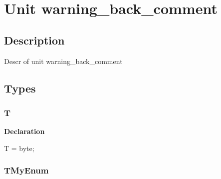 \documentclass{report}
\newif\ifpdf
\begin{document}
\label{toc}\tableofcontents
\newpage
\newlength{\tmplength}
\chapter{Unit warning{\_}back{\_}comment}
\label{warning_back_comment}
\section{Description}
Descr of unit warning{\_}back{\_}comment
\section{Types}
\ifpdf
\subsection*{\large{\textbf{T}}\normalsize\hspace{1ex}\hrulefill}
\else
\subsection*{T}
\fi
\label{warning_back_comment-T}
\begin{list}{}{
\setlength{\itemindent}{0cm}
\setlength{\listparindent}{0cm}
\setlength{\leftmargin}{\evensidemargin}
\addtolength{\leftmargin}{\tmplength}
\settowidth{\labelsep}{X}
\addtolength{\leftmargin}{\labelsep}
\setlength{\labelwidth}{\tmplength}
}
\item[\textbf{Declaration}\hfill]
\ifpdf
\begin{flushleft}
\fi
\begin{ttfamily}
T = byte;\end{ttfamily}

\ifpdf
\end{flushleft}
\fi

\end{list}
\ifpdf
\subsection*{\large{\textbf{TMyEnum}}\normalsize\hspace{1ex}\hrulefill}
\else
\end{document}
